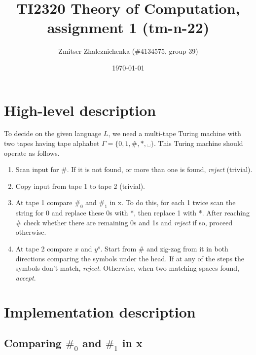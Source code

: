 \documentclass[a4paper, notitlepage]{article}
\begin{document}
\title{TI2320 Theory of Computation, assignment 1 (tm-n-22)} 
\author{Zmitser Zhaleznichenka (\#4134575, group 39)}
\date{\today}
\maketitle

\setcounter{secnumdepth}{0}

\section{High-level description}

To decide on the given language $L$, we need a multi-tape Turing machine with two tapes having tape alphabet $\Gamma = \{0, 1, \#, *, ␣\}$. This Turing machine should operate as follows. 

\begin{enumerate}

\item Scan input for \#. If it is not found, or more than one is found, \emph{reject} (trivial).

\item Copy input from tape 1 to tape 2 (trivial).

\item At tape 1 compare \(\#_0\) and \(\#_1\) in x. To do this, for each 1 twice scan the string for 0 and replace these 0s with *, then replace 1 with *. After reaching \# check whether there are remaining 0s and 1s and \emph{reject} if so, proceed otherwise.

\item At tape 2 compare $x$ and $y^s$. Start from \# and zig-zag from it in both directions comparing the symbols under the head. If at any of the steps the symbols don't match, \emph{reject}. Otherwise, when two matching spaces found, \emph{accept}.

\end{enumerate}

\section{Implementation description}

\subsection{Comparing $\#_0$ and $\#_1$ in x}
\end{document}
